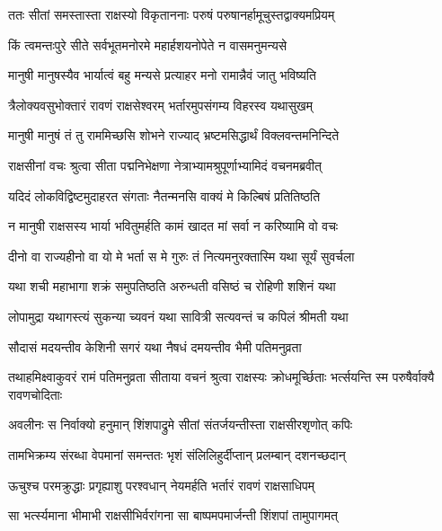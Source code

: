 
\twolineshloka
{ततः सीतां समस्तास्ता राक्षस्यो विकृताननाः}
{परुषं परुषानर्हामूचुस्तद्वाक्यमप्रियम्} %

\twolineshloka
{किं त्वमन्तःपुरे सीते सर्वभूतमनोरमे}
{महार्हशयनोपेते न वासमनुमन्यसे} %

\twolineshloka
{मानुषी मानुषस्यैव भार्यात्वं बहु मन्यसे}
{प्रत्याहर मनो रामान्नैवं जातु भविष्यति} %

\twolineshloka
{त्रैलोक्यवसुभोक्तारं रावणं राक्षसेश्वरम्}
{भर्तारमुपसंगम्य विहरस्व यथासुखम्} %

\twolineshloka
{मानुषी मानुषं तं तु राममिच्छसि शोभने}
{राज्याद् भ्रष्टमसिद्धार्थं विक्लवन्तमनिन्दिते} %

\twolineshloka
{राक्षसीनां वचः श्रुत्वा सीता पद्मनिभेक्षणा}
{नेत्राभ्यामश्रुपूर्णाभ्यामिदं वचनमब्रवीत्} %

\twolineshloka
{यदिदं लोकविद्विष्टमुदाहरत संगताः}
{नैतन्मनसि वाक्यं मे किल्बिषं प्रतितिष्ठति} %

\twolineshloka
{न मानुषी राक्षसस्य भार्या भवितुमर्हति}
{कामं खादत मां सर्वा न करिष्यामि वो वचः} %

\twolineshloka
{दीनो वा राज्यहीनो वा यो मे भर्ता स मे गुरुः}
{तं नित्यमनुरक्तास्मि यथा सूर्यं सुवर्चला} %

\twolineshloka
{यथा शची महाभागा शक्रं समुपतिष्ठति}
{अरुन्धती वसिष्ठं च रोहिणी शशिनं यथा} %

\twolineshloka
{लोपामुद्रा यथागस्त्यं सुकन्या च्यवनं यथा}
{सावित्री सत्यवन्तं च कपिलं श्रीमती यथा} %

\twolineshloka
{सौदासं मदयन्तीव केशिनी सगरं यथा}
{नैषधं दमयन्तीव भैमी पतिमनुव्रता} %

\threelineshloka
{तथाहमिक्ष्वाकुवरं रामं पतिमनुव्रता}
{सीताया वचनं श्रुत्वा राक्षस्यः क्रोधमूर्च्छिताः}
{भर्त्सयन्ति स्म परुषैर्वाक्यै रावणचोदिताः} %

\twolineshloka
{अवलीनः स निर्वाक्यो हनुमान् शिंशपाद्रुमे}
{सीतां संतर्जयन्तीस्ता राक्षसीरशृणोत् कपिः} %

\twolineshloka
{तामभिक्रम्य संरब्धा वेपमानां समन्ततः}
{भृशं संलिलिहुर्दीप्तान् प्रलम्बान् दशनच्छदान्} %

\twolineshloka
{ऊचुश्च परमक्रुद्धाः प्रगृह्याशु परश्वधान्}
{नेयमर्हति भर्तारं रावणं राक्षसाधिपम्} %

\twolineshloka
{सा भर्त्स्यमाना भीमाभी राक्षसीभिर्वरांगना}
{सा बाष्पमपमार्जन्ती शिंशपां तामुपागमत्} %

